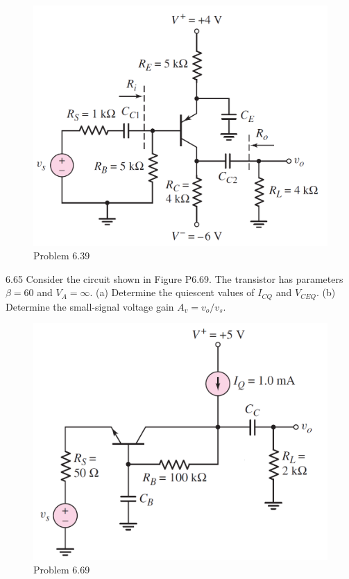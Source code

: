 \documentclass[a4paper,11pt,UTF8]{article}
\begin{document}
\begin{figure}[H] 
	\centering 
	\includegraphics[scale=0.3]{MD6.39.png}
	\caption{Problem 6.39}
\end{figure}
6.65 Consider the circuit shown in Figure P6.69. The transistor has parameters
$\beta = 60$ and $V_A =\infty$. (a) Determine the quiescent values of $I_{CQ}$ and $V_{CEQ}$.
(b) Determine the small-signal voltage gain $A_v = v_o/v_s$.
\begin{figure}[H] 
	\centering 
	\includegraphics[scale=0.3]{MD6.69.png}
	\caption{Problem 6.69}
\end{figure}
\end{document}
